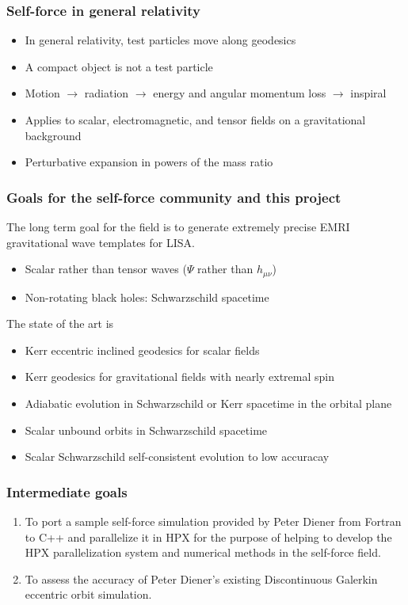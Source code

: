 \documentclass{beamer}
\begin{document}
\begin{frame}
  \frametitle{Self-force in general relativity}
  \begin{itemize}
  \item In general relativity, test particles move along geodesics
  \item A compact object is not a test particle
  \item Motion $\rightarrow$ radiation $\rightarrow$ energy and angular momentum loss $\rightarrow$ inspiral
  \item Applies to scalar, electromagnetic, and tensor fields on a gravitational background
  \item Perturbative expansion in powers of the mass ratio
  \end{itemize}
\end{frame}

\begin{frame}
  \frametitle{Goals for the self-force community and this project}
  The long term goal for the field is to generate extremely precise EMRI gravitational wave templates for LISA.

  \begin{itemize}
  \item Scalar rather than tensor waves ($\Psi$ rather than $h_{\mu\nu}$)
  \item Non-rotating black holes: Schwarzschild spacetime
  \end{itemize}

  The state of the art is
  \begin{itemize}
  \item Kerr eccentric inclined geodesics for scalar fields 
  \item Kerr geodesics for gravitational fields with nearly extremal spin
  \item Adiabatic evolution in Schwarzschild or Kerr spacetime in the orbital plane
  \item Scalar unbound orbits in Schwarzschild spacetime
  \item Scalar Schwarzschild self-consistent evolution to low accuracay
  \end{itemize}
  
\end{frame}


\begin{frame}
  \frametitle{Intermediate goals}
  \begin{enumerate}
  \item To port a sample self-force simulation provided by Peter Diener from Fortran to C++ and parallelize it in HPX for the purpose of helping to develop the HPX parallelization system and numerical methods in the self-force field. 
  \item To assess the accuracy of Peter Diener's existing Discontinuous Galerkin eccentric orbit simulation.  
  \end{enumerate}
\end{frame}
\end{document}
